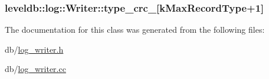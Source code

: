 \subsubsection[{type\+\_\+crc\+\_\+}]{ leveldb\+::log\+::\+Writer\+::type\+\_\+crc\+\_\+\mbox{[}{\bf k\+Max\+Record\+Type}+1\mbox{]}\hspace{0.3cm}{\ttfamily [private]}}\label{classleveldb_1_1log_1_1_writer_a0e09a993f3d477abe96288297e8094b1}


The documentation for this class was generated from the following files\+:\begin{DoxyCompactItemize}
\item 
db/\hyperlink{log__writer_8h}{log\+\_\+writer.\+h}\item 
db/\hyperlink{log__writer_8cc}{log\+\_\+writer.\+cc}\end{DoxyCompactItemize}
